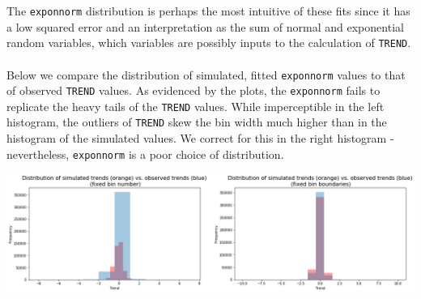 The \texttt{exponnorm} distribution is perhaps the most intuitive of these fits since it has a low squared error and an interpretation as the sum of normal and exponential random variables, which variables are possibly inputs to the calculation of \texttt{TREND}.\\\\
Below we compare the distribution of simulated, fitted \texttt{exponnorm} values to that of observed \texttt{TREND} values. As evidenced by the plots, the \texttt{exponnorm} fails to replicate the heavy tails of the \texttt{TREND} values. While imperceptible in the left histogram, the outliers of \texttt{TREND} skew the bin width much higher than in the histogram of the simulated values. We correct for this in the right histogram - nevertheless, \texttt{exponnorm} is a poor choice of distribution.
\begin{center}
\includegraphics[scale=.3]{images/sim_vs_obs.png}
\end{center}

